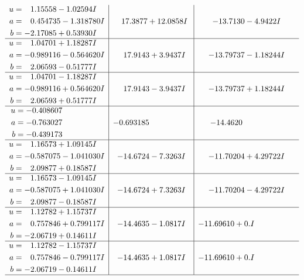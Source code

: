 \documentclass[1p]{elsarticle_modified}
\theoremstyle{definition}
\begin{document}
$$\begin{array}{c|c|c}
\begin{aligned}
u &= \phantom{-}1.15558 - 1.02594 I \\
a &= \phantom{-}0.454735 - 1.318780 I \\
b &= -2.17085 + 0.53930 I\end{aligned}
 & \phantom{-}17.3877 + 12.0858 I & -13.7130 - 4.9422 I \\ \hline\begin{aligned}
u &= \phantom{-}1.04701 + 1.18287 I \\
a &= -0.989116 - 0.564620 I \\
b &= \phantom{-}2.06593 - 0.51777 I\end{aligned}
 & \phantom{-}17.9143 + 3.9437 I & -13.79737 - 1.18244 I \\ \hline\begin{aligned}
u &= \phantom{-}1.04701 - 1.18287 I \\
a &= -0.989116 + 0.564620 I \\
b &= \phantom{-}2.06593 + 0.51777 I\end{aligned}
 & \phantom{-}17.9143 - 3.9437 I & -13.79737 + 1.18244 I \\ \hline\begin{aligned}
u &= -0.408607\phantom{ +0.000000I} \\
a &= -0.763027\phantom{ +0.000000I} \\
b &= -0.439173\phantom{ +0.000000I}\end{aligned}
 & -0.693185\phantom{ +0.000000I} & -14.4620\phantom{ +0.000000I} \\ \hline\begin{aligned}
u &= \phantom{-}1.16573 + 1.09145 I \\
a &= -0.587075 - 1.041030 I \\
b &= \phantom{-}2.09877 + 0.18587 I\end{aligned}
 & -14.6724 - 7.3263 I & -11.70204 + 4.29722 I \\ \hline\begin{aligned}
u &= \phantom{-}1.16573 - 1.09145 I \\
a &= -0.587075 + 1.041030 I \\
b &= \phantom{-}2.09877 - 0.18587 I\end{aligned}
 & -14.6724 + 7.3263 I & -11.70204 - 4.29722 I \\ \hline\begin{aligned}
u &= \phantom{-}1.12782 + 1.15737 I \\
a &= \phantom{-}0.757846 + 0.799117 I \\
b &= -2.06719 + 0.14611 I\end{aligned}
 & -14.4635 - 1.0817 I & -11.69610 + 0. I\phantom{ +0.000000I} \\ \hline\begin{aligned}
u &= \phantom{-}1.12782 - 1.15737 I \\
a &= \phantom{-}0.757846 - 0.799117 I \\
b &= -2.06719 - 0.14611 I\end{aligned}
 & -14.4635 + 1.0817 I & -11.69610 + 0. I\phantom{ +0.000000I}\\
 \hline 
 \end{array}$$\newpage\newpage\renewcommand{\arraystretch}{1}
\end{document}
